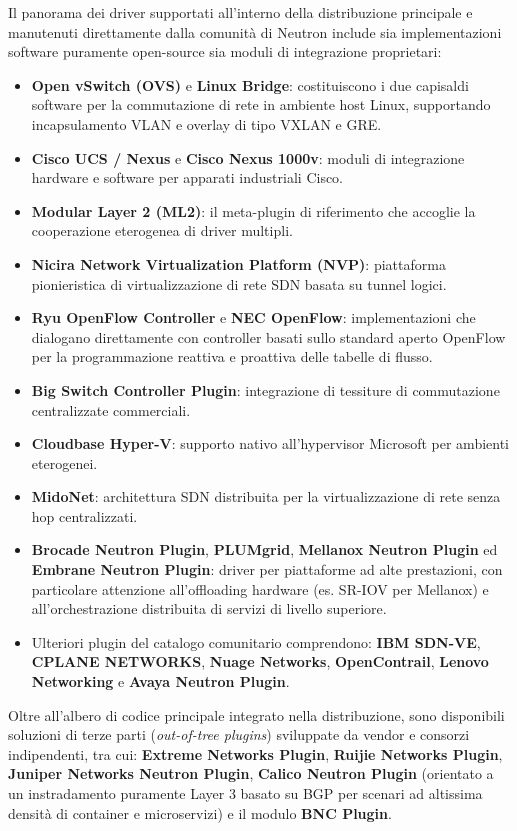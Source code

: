 \documentclass[11pt, a4paper]{article}
\begin{document}
Il panorama dei driver supportati all'interno della distribuzione principale e manutenuti direttamente dalla comunità di Neutron include sia implementazioni software puramente open-source sia moduli di integrazione proprietari:
\begin{itemize}[noitemsep]
    \item \textbf{Open vSwitch (OVS)} e \textbf{Linux Bridge}: costituiscono i due capisaldi software per la commutazione di rete in ambiente host Linux, supportando incapsulamento VLAN e overlay di tipo VXLAN e GRE.
    \item \textbf{Cisco UCS / Nexus} e \textbf{Cisco Nexus 1000v}: moduli di integrazione hardware e software per apparati industriali Cisco.
    \item \textbf{Modular Layer 2 (ML2)}: il meta-plugin di riferimento che accoglie la cooperazione eterogenea di driver multipli.
    \item \textbf{Nicira Network Virtualization Platform (NVP)}: piattaforma pionieristica di virtualizzazione di rete SDN basata su tunnel logici.
    \item \textbf{Ryu OpenFlow Controller} e \textbf{NEC OpenFlow}: implementazioni che dialogano direttamente con controller basati sullo standard aperto OpenFlow per la programmazione reattiva e proattiva delle tabelle di flusso.
    \item \textbf{Big Switch Controller Plugin}: integrazione di tessiture di commutazione centralizzate commerciali.
    \item \textbf{Cloudbase Hyper-V}: supporto nativo all'hypervisor Microsoft per ambienti eterogenei.
    \item \textbf{MidoNet}: architettura SDN distribuita per la virtualizzazione di rete senza hop centralizzati.
    \item \textbf{Brocade Neutron Plugin}, \textbf{PLUMgrid}, \textbf{Mellanox Neutron Plugin} ed \textbf{Embrane Neutron Plugin}: driver per piattaforme ad alte prestazioni, con particolare attenzione all'offloading hardware (es. SR-IOV per Mellanox) e all'orchestrazione distribuita di servizi di livello superiore.
    \item Ulteriori plugin del catalogo comunitario comprendono: \textbf{IBM SDN-VE}, \textbf{CPLANE NETWORKS}, \textbf{Nuage Networks}, \textbf{OpenContrail}, \textbf{Lenovo Networking} e \textbf{Avaya Neutron Plugin}.
\end{itemize}

Oltre all'albero di codice principale integrato nella distribuzione, sono disponibili soluzioni di terze parti (\emph{out-of-tree plugins}) sviluppate da vendor e consorzi indipendenti, tra cui: \textbf{Extreme Networks Plugin}, \textbf{Ruijie Networks Plugin}, \textbf{Juniper Networks Neutron Plugin}, \textbf{Calico Neutron Plugin} (orientato a un instradamento puramente Layer 3 basato su BGP per scenari ad altissima densità di container e microservizi) e il modulo \textbf{BNC Plugin}.
\end{document}
